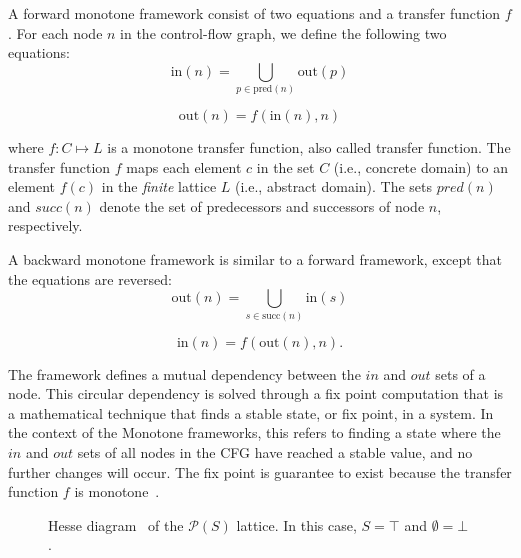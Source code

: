 A forward monotone framework consist of two equations and a transfer function $f$.
For each node $n$ in the control-flow graph, we define the following two equations:
$$\text{in}(n) = \bigcup\limits_{p \in \text{pred}(n)} \text{out}(p)$$

$$\text{out}(n) = f(\text{in}(n), n)$$

where $f:C \mapsto L$ is a monotone transfer function, also called transfer function. 
The transfer function $f$ maps each element $c$ in the set $C$ (i.e., concrete domain) 
to an element $f(c)$ in the \emph{finite} lattice $L$ (i.e., abstract domain). The sets $pred(n)$ and $succ(n)$ 
denote the set of predecessors and successors of node $n$, respectively.

A backward monotone framework is similar to a forward framework, except that the equations are reversed:
$$\text{out}(n) = \bigcup\limits_{s \in \text{succ}(n)} \text{in}(s)$$

$$\text{in}(n) = f(\text{out}(n), n).$$

The framework defines a mutual dependency between the $in$ and $out$ sets of a node.
This circular dependency is solved through a fix point computation that is
a mathematical technique that finds a stable state, or fix point, in a system.
In the context of the Monotone frameworks, this 
refers to finding a state where the $in$ and $out$ sets of all nodes in the CFG have reached a 
stable value, and no further changes will occur. The fix point is guarantee to exist
because the transfer function $f$ is monotone~\cite{Knaster1929}.




\begin{figure}[h]
    \centering
{}
  \caption{\label{fig:lattice}Hesse diagram~\cite{Hesse1874} of the $\mathcal{P}(S)$ lattice.
  In this case, $S = \top$ and $\emptyset = \bot$.}
\end{figure}

